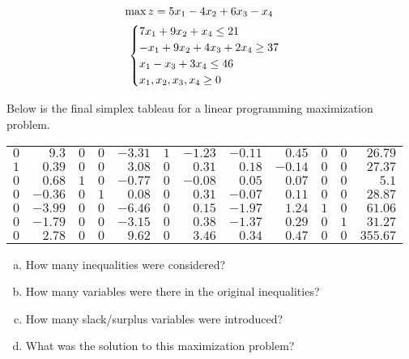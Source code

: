 \documentclass[11pt,letterpaper]{article}
\begin{document}
	\[
	\begin{gathered}
	\hspace{-0.7cm} \max z= 5x_1 - 4x_2 + 6x_3 - x_4 \\
	\begin{cases}
	7x_1 + 9x_2 + x_4 \leq 21 \\
	-x_1 + 9x_2 + 4x_3 + 2x_4 \geq 37 \\
	x_1 - x_3 + 3x_4 \leq 46 \\
	x_1, x_2, x_3, x_4 \geq 0
	\end{cases}
	\end{gathered}
	\] 
	



\newpage



 Below is the final simplex tableau for a linear programming maximization problem. \par
	\begin{table}[H]
	\centering
	\begin{tabular}{rrrrrrrrrrrr}
	$0$ & $9.3$ & $0$ & $0$ & $-3.31$ & $1$ & $-1.23$ & $-0.11$ & $0.45$ & $0$ & $0$ & $26.79$ \\
	$1$ & $0.39$ & $0$ & $0$ & $3.08$ & $0$ & $0.31$ & $0.18$ & $-0.14$ & $0$ & $0$ & $27.37$ \\
	$0$ & $0.68$ & $1$ & $0$ & $-0.77$ & $0$ & $-0.08$ & $0.05$ & $0.07$ & $0$ & $0$ & $5.1$ \\
	$0$ & $-0.36$ & $0$ & $1$ & $0.08$ & $0$ & $0.31$ & $-0.07$ & $0.11$ & $0$ & $0$ & $28.87$ \\
	$0$ & $-3.99$ & $0$ & $0$ & $-6.46$ & $0$ & $0.15$ & $-1.97$ & $1.24$ & $1$ & $0$ & $61.06$ \\
	$0$ & $-1.79$ & $0$ & $0$ & $-3.15$ & $0$ & $0.38$ & $-1.37$ & $0.29$ & $0$ & $1$ & $31.27$ \\
	$0$ & $2.78$ & $0$ & $0$ & $9.62$ & $0$ & $3.46$ & $0.34$ & $0.47$ & $0$ & $0$ & $355.67$
	\end{tabular}
	\end{table}

\begin{enumerate}[(a)]
\item How many inequalities were considered?
\item How many variables were there in the original inequalities?
\item How many slack/surplus variables were introduced?
\item What was the solution to this maximization problem?
\end{enumerate} 
\end{document}
